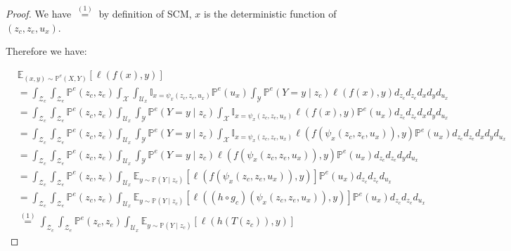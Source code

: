 \begin{proof}
We have $\stackrel{(1)}{=}$ by definition of SCM, $x$ is the deterministic function of $(z_c, z_e,u_x)$.

Therefore we have:

\begin{align}
&\mathbb{E}_{(x,y)\sim\mathbb{P}^{e}(X,Y)}\left[\ell\left(f\left(x\right),y\right)\right]\nonumber\\
&= 
\int_{\mathcal{Z}_c}\int_{\mathcal{Z}_e}\mathbb{P}^{e}(z_c,z_e)\int_{\mathcal{X}}\int_{\mathcal{U}_x}\mathbb{I}_{x= \psi_x(z_c, z_e,u_x)}\mathbb{P}^{e}(u_x)\int_{\mathcal{Y}}\mathbb{P}^{e}(Y=y\mid z_c)\ell\left(f\left(x\right),y\right)  d_{z_c} d_{z_e} d_x d_y d_{u_x}\nonumber\\
&= 
\int_{\mathcal{Z}_c}\int_{\mathcal{Z}_e}\mathbb{P}^{e}(z_c,z_e)\int_{\mathcal{U}_x}\int_{\mathcal{Y}}\mathbb{P}^{e}(Y=y\mid z_c)\int_{\mathcal{X}}\mathbb{I}_{x= \psi_x(z_c, z_e,u_x)}\ell\left(f\left(x\right),y\right) \mathbb{P}^{e}(u_x) d_{z_c} d_{z_e} d_x d_y d_{u_x}\nonumber\\
&= 
\int_{\mathcal{Z}_c}\int_{\mathcal{Z}_e}\mathbb{P}^{e}(z_c,z_e)\int_{\mathcal{U}_x}\int_{\mathcal{Y}}\mathbb{P}^{e}(Y=y\mid z_c)\int_{\mathcal{X}}\mathbb{I}_{x= \psi_x(z_c, z_e,u_x)}\ell\left(f\left(\psi_x(z_c, z_e,u_x)\right),y\right) \mathbb{P}^{e}(u_x) d_{z_c} d_{z_e} d_x d_y d_{u_x}\nonumber
\\
&= 
\int_{\mathcal{Z}_c}\int_{\mathcal{Z}_e}\mathbb{P}^{e}(z_c,z_e)\int_{\mathcal{U}_x}\int_{\mathcal{Y}}\mathbb{P}^{e}(Y=y\mid z_c)\ell\left(f\left(\psi_x(z_c, z_e,u_x)\right),y\right) \mathbb{P}^{e}(u_x) d_{z_c} d_{z_e} d_y d_{u_x}\nonumber
\\
&= 
\int_{\mathcal{Z}_c}\int_{\mathcal{Z}_e}\mathbb{P}^{e}(z_c,z_e)\int_{\mathcal{U}_x}\mathbb{E}_{y\sim\mathbb{P}(Y\mid z_c)} \left[ \ell\left(f\left(\psi_x(z_c, z_e,u_x)\right),y\right)\right]
 \mathbb{P}^{e}(u_x) d_{z_c} d_{z_e}  d_{u_x}\nonumber
\\
&= 
\int_{\mathcal{Z}_c}\int_{\mathcal{Z}_e}\mathbb{P}^{e}(z_c,z_e)\int_{\mathcal{U}_x}\mathbb{E}_{y\sim\mathbb{P}(Y\mid z_c)} \left[ \ell\left((h\circ g_c)\left(\psi_x(z_c, z_e,u_x)\right),y\right)\right]
 \mathbb{P}^{e}(u_x) d_{z_c} d_{z_e}  d_{u_x}\nonumber
\\
&\stackrel{(1)}{=} 
\int_{\mathcal{Z}_c}\int_{\mathcal{Z}_e}\mathbb{P}^{e}(z_c,z_e)\int_{\mathcal{U}_x}\mathbb{E}_{y\sim\mathbb{P}(Y\mid z_c)} \left[ \ell\left(h\left(T(z_c)\right),y\right)\right]

\end{align}
\end{proof}
